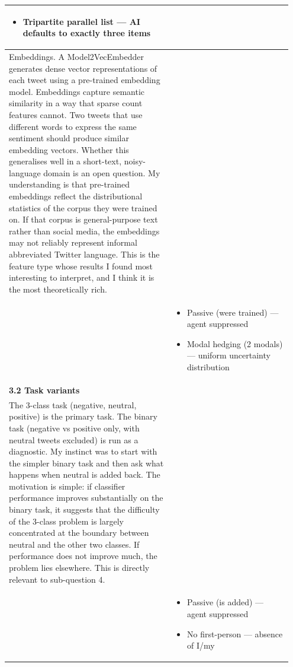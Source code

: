 \documentclass[11pt]{article}
\begin{document}
\begin{longtable}{|p{0.55\linewidth}|p{0.40\linewidth}|}
\begin{itemize}[leftmargin=1em,itemsep=1pt,topsep=1pt,parsep=0pt]
  \item Tripartite parallel list --- AI defaults to exactly three items
\end{itemize} \\
\hline
Embeddings. A Model2VecEmbedder generates dense vector representations of each tweet using a pre-trained embedding model. Embeddings capture semantic similarity in a way that sparse count features cannot. Two tweets that use different words to express the same sentiment should produce similar embedding vectors. Whether this generalises well in a short-text, noisy-language domain is an open question. My understanding is that pre-trained embeddings reflect the distributional statistics of the corpus they were trained on. If that corpus is general-purpose text rather than social media, the embeddings may not reliably represent informal abbreviated Twitter language. This is the feature type whose results I found most interesting to interpret, and I think it is the most theoretically rich. & \\[2pt]
\hline
\rule[-3.5cm]{0pt}{3.5cm} & \begin{itemize}[leftmargin=1em,itemsep=1pt,topsep=1pt,parsep=0pt]
  \item Passive (were trained) --- agent suppressed
  \item Modal hedging (2 modals) --- uniform uncertainty distribution
\end{itemize} \\
\hline
\textbf{3.2 Task variants}\\[4pt]
The 3-class task (negative, neutral, positive) is the primary task. The binary task (negative vs positive only, with neutral tweets excluded) is run as a diagnostic. My instinct was to start with the simpler binary task and then ask what happens when neutral is added back. The motivation is simple: if classifier performance improves substantially on the binary task, it suggests that the difficulty of the 3-class problem is largely concentrated at the boundary between neutral and the other two classes. If performance does not improve much, the problem lies elsewhere. This is directly relevant to sub-question 4. & \\[2pt]
\hline
\rule[-3.5cm]{0pt}{3.5cm} & \begin{itemize}[leftmargin=1em,itemsep=1pt,topsep=1pt,parsep=0pt]
  \item Passive (is added) --- agent suppressed
  \item No first-person --- absence of I/my
\end{itemize} \\

\end{longtable}
\end{document}
